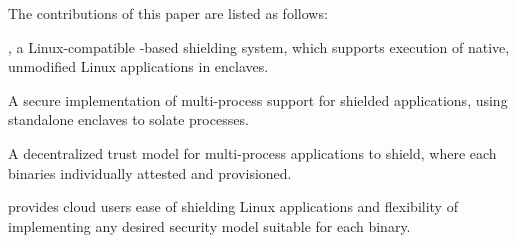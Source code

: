 The contributions of this paper are listed as follows:
\begin{compactitem}
\item \graphenesgx{}, a Linux-compatible \libos{}-based shielding system,
which supports execution of native, unmodified Linux applications
in \sgx{} enclaves.
\item A secure implementation of multi-process support
for shielded applications,
using standalone enclaves to solate processes.
\item A decentralized trust model for multi-process applications to shield,
where each binaries individually attested and provisioned.
\end{compactitem}

\graphenesgx{} provides cloud users
ease of shielding Linux applications
and flexibility of implementing any desired security model
suitable for each binary.

